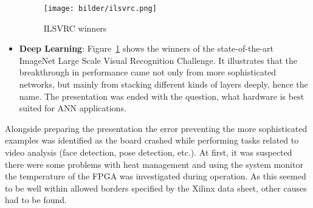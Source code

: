 \begin{itemize}
	\begin{figure}[!htb]
	\centering
		\texttt{[image: bilder/ilsvrc.png]}
		\caption{ILSVRC winners}
		\label{fig:ilsvrc}
\end{figure}
	\item \textbf{Deep Learning}: Figure~\ref{fig:ilsvrc} shows the winners of the state-of-the-art ImageNet Large Scale Visual Recognition Challenge. It illustrates that the breakthrough in performance came not only from more sophisticated networks, but mainly from stacking different kinds of layers deeply, hence the name. The presentation was ended with the question, what hardware is best suited for \ac{ANN} applications.
\end{itemize}
Alongside preparing the presentation the error preventing the more sophisticated examples was identified as the board crashed while performing tasks related to video analysis (face detection, pose detection, etc.). At first, it was suspected there were some problems with heat management and using the system monitor the temperature of the \ac{FPGA} was investigated during operation. As this seemed to be well within allowed borders specified by the Xilinx data sheet, other causes had to be found.